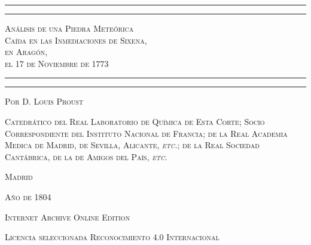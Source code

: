 \documentclass[a4paper, 12pt, oneside, spanish]{article}
\begin{document}
\Fontauri
\begin{titlepage} %
	\centering %

	
	\rule{\textwidth}{1.6pt}\vspace*{-\baselineskip}\vspace*{2pt} %
	\rule{\textwidth}{0.4pt} %
	
	\vspace{1\baselineskip} %
	
	{\scshape\LARGE Análisis de una Piedra Meteórica \\Caída en las Inmediaciones de Sixena, \\en Aragón, \\el 17 de Noviembre de 1773}
	
	\vspace{1\baselineskip} %

	\rule{\textwidth}{0.4pt}\vspace*{-\baselineskip}\vspace{3.2pt} %
	\rule{\textwidth}{1.6pt} %
	
	\vspace{1\baselineskip} %
	
	
	{\scshape \Large Por D. Louis Proust} %
	
	\vspace*{1\baselineskip} %
	
        {\scshape\normalsize Catedrático del Real Laboratorio de Química de Esta Corte; Socio Correspondiente del Instituto Nacional de Francia; de la Real Academia Medica de Madrid, de Sevilla, Alicante, \emph{etc.}; de la Real Sociedad Cantábrica, de la de Amigos del País, \emph{etc.} } %
    
        \vspace*{\fill}

	\vspace{1\baselineskip}

	{\small\scshape{Madrid}}

	{\small\scshape Año de 1804}
		
	\vspace{0.5\baselineskip} %

        \scshape Internet Archive Online Edition  %
	
	{\scshape\small Licencia seleccionada Reconocimiento 4.0 Internacional} %
\end{titlepage}
\end{document}

